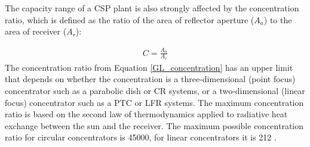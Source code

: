 The capacity range of a \ac{CSP} plant is also strongly affected by the concentration ratio, which is defined as the ratio of the area of reflector aperture ($A_a$) to the area of receiver ($A_r$):

\begin{align}
C=\frac{A_{a}}{A_{r}} \label{GL_concentration}
\end{align}
The concentration ratio from Equation \ref{GL_concentration} has an upper limit that depends on whether the concentration is a three-dimensional (point focus) concentrator such as a parabolic dish or \ac{CR} systems, or a two-dimensional (linear focus) concentrator such as a \ac{PTC} or \ac{LFR} systems. The maximum concentration ratio is based on the second law of thermodynamics applied to radiative heat exchange between the sun and the receiver. The maximum possible concentration ratio for circular concentrators is \num{45000}, for linear concentrators it is \num{212} \cite{Duffie2013}.

